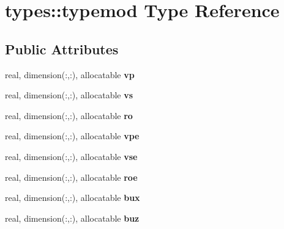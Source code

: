 \hypertarget{structtypes_1_1typemod}{\section{types\-:\-:typemod Type Reference}
\label{structtypes_1_1typemod}
}
\subsection*{Public Attributes}
\begin{DoxyCompactItemize}
\item 
\hypertarget{structtypes_1_1typemod_a8475da00637e3d5e8e8a1304e5b8b639}{real, dimension(\-:,\-:), allocatable {\bfseries vp}}\label{structtypes_1_1typemod_a8475da00637e3d5e8e8a1304e5b8b639}

\item 
\hypertarget{structtypes_1_1typemod_ae02e68359342112048214a0f1df7c49e}{real, dimension(\-:,\-:), allocatable {\bfseries vs}}\label{structtypes_1_1typemod_ae02e68359342112048214a0f1df7c49e}

\item 
\hypertarget{structtypes_1_1typemod_a1155ebc5422219ba18b999a9655449bb}{real, dimension(\-:,\-:), allocatable {\bfseries ro}}\label{structtypes_1_1typemod_a1155ebc5422219ba18b999a9655449bb}

\item 
\hypertarget{structtypes_1_1typemod_a16bd2fb530f6c310b408e8bfa5a4427d}{real, dimension(\-:,\-:), allocatable {\bfseries vpe}}\label{structtypes_1_1typemod_a16bd2fb530f6c310b408e8bfa5a4427d}

\item 
\hypertarget{structtypes_1_1typemod_ad8bb92fbcf48dbc5f6510b1155c3e4a1}{real, dimension(\-:,\-:), allocatable {\bfseries vse}}\label{structtypes_1_1typemod_ad8bb92fbcf48dbc5f6510b1155c3e4a1}

\item 
\hypertarget{structtypes_1_1typemod_a9190ea3bcc7007540be1be864607de6d}{real, dimension(\-:,\-:), allocatable {\bfseries roe}}\label{structtypes_1_1typemod_a9190ea3bcc7007540be1be864607de6d}

\item 
\hypertarget{structtypes_1_1typemod_a36c0aec3fcfd2fe1b87adfae1c226731}{real, dimension(\-:,\-:), allocatable {\bfseries bux}}\label{structtypes_1_1typemod_a36c0aec3fcfd2fe1b87adfae1c226731}

\item 
\hypertarget{structtypes_1_1typemod_a55ce5380f7e42cc8d6877ae43c13b02d}{real, dimension(\-:,\-:), allocatable {\bfseries buz}}\label{structtypes_1_1typemod_a55ce5380f7e42cc8d6877ae43c13b02d}


\end{DoxyCompactItemize}
